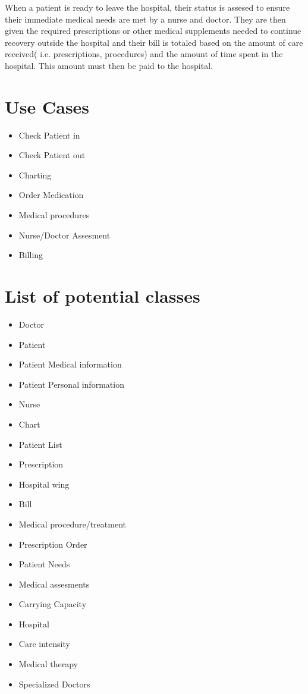 \documentclass{article}
\begin{document}
\noindent When a patient is ready to leave the hospital, their status is assesed to ensure their immediate medical needs are met by a nurse and doctor. They are then given the required prescriptions or other
medical supplements needed to continue recovery outside the hospital and their bill is totaled based on the amount of care received( i.e. prescriptions, procedures) and the amount of time spent in the hospital. 
This amount must then be paid to the hospital.
\break

\section{Use Cases}

\begin{itemize}
\item Check Patient in
\item Check Patient out
\item Charting
\item Order Medication
\item Medical procedures
\item Nurse/Doctor Assesment
\item Billing

\end{itemize}

\section{List of potential classes}

\begin{itemize}
\item Doctor
\item Patient
\item Patient Medical information
\item Patient Personal information
\item Nurse
\item Chart
\item Patient List
\item Prescription
\item Hospital wing
\item Bill 
\item Medical procedure/treatment 
\item Prescription Order
\item Patient Needs 
\item Medical assesments 
\item Carrying Capacity
\item Hospital
\item Care intensity
\item Medical therapy
\item Specialized Doctors



\end{itemize}
\end{document}
